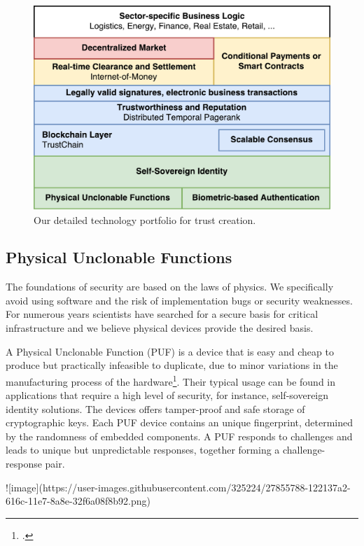 \documentclass[USenglish]{article}
\begin{document}
\begin{figure}[t]
	\centering
	\includegraphics[width=1\columnwidth]{assets/tech_stack}
	\caption{Our detailed technology portfolio for trust creation.}
	\label{fig:tech_stack}
\end{figure}

\subsection{Physical Unclonable Functions}

The foundations of security are based on the laws of physics.
We specifically avoid using software and the risk of implementation bugs or security weaknesses.
For numerous years scientists have searched for a secure basis for critical infrastructure and we believe physical devices provide the desired basis.

A Physical Unclonable Function (PUF) is a device that is easy and cheap to produce but practically infeasible to duplicate, due to minor variations in the manufacturing process of the hardware\footcite{cortez2012modeling}.
Their typical usage can be found in applications that require a high level of security, for instance, self-sovereign identity solutions.
The devices offers tamper-proof and safe storage of cryptographic keys.
Each PUF device contains an unique fingerprint, determined by the randomness of embedded components.
A PUF responds to challenges and leads to unique but unpredictable responses, together forming a challenge-response pair.

![image](https://user-images.githubusercontent.com/325224/27855788-122137a2-616c-11e7-8a8e-32f6a08f8b92.png)
\end{document}

